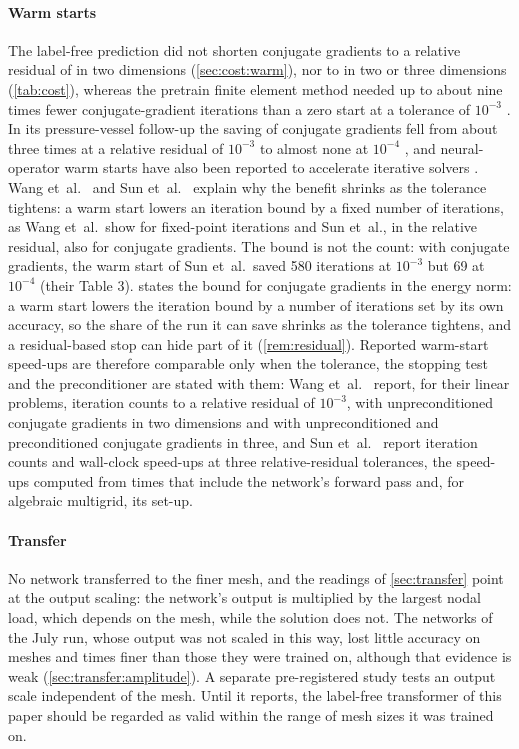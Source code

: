 \paragraph{Warm starts}
The label-free prediction did not shorten conjugate gradients to a relative residual of
\numKfiveTol{} in two dimensions (\cref{sec:cost:warm}), nor to \numCostCgTol{} in two or
three dimensions (\cref{tab:cost}), whereas the pretrain finite element
method needed up to about nine times fewer conjugate-gradient iterations than a zero start
at a tolerance of $10^{-3}$ \cite{Wang2026PretrainFEM}. In its pressure-vessel follow-up the
saving of conjugate gradients fell from about three times at a relative residual of
$10^{-3}$ to almost none at $10^{-4}$ \cite{Sun2026FEVessel}, and neural-operator warm
starts have also been reported to accelerate iterative solvers \cite{Eshaghi2026NOWS}.
Wang et~al.~\cite{Wang2026PretrainFEM} and Sun et~al.~\cite{Sun2026FEVessel} explain why
the benefit shrinks as the tolerance tightens: a warm start lowers an iteration bound by a
fixed number of iterations, as Wang et~al.\ show for fixed-point iterations and Sun et~al.,
in the relative residual, also for conjugate gradients. The bound is not the count: with
conjugate gradients, the warm start of Sun et~al.\ saved 580 iterations at $10^{-3}$ but 69
at $10^{-4}$ (their Table 3).  states the bound for conjugate gradients in the
energy norm: a warm start lowers the iteration bound by a number of iterations set by its
own accuracy, so the share of the run it can save shrinks as the tolerance tightens, and
a residual-based stop can hide part of it (\cref{rem:residual}). Reported warm-start
speed-ups are therefore comparable only when the tolerance, the stopping test and the
preconditioner are stated with them: Wang et~al.~\cite{Wang2026PretrainFEM} report, for
their linear problems, iteration counts to a relative residual of $10^{-3}$, with
unpreconditioned conjugate gradients in two dimensions and with unpreconditioned and
preconditioned conjugate gradients in three, and Sun et~al.~\cite{Sun2026FEVessel} report
iteration counts and wall-clock speed-ups at three relative-residual tolerances, the
speed-ups computed from times that include the network's forward pass and, for algebraic
multigrid, its set-up.

\paragraph{Transfer}
No network transferred to the finer mesh, and the readings of \cref{sec:transfer} point at
the output scaling: the network's output is multiplied by the largest nodal load, which
depends on the mesh, while the solution does not. The networks of the July run, whose output
was not scaled in this way, lost little accuracy on meshes \numCoarsenLow{} and
\numCoarsenHigh{} times finer than those they were trained on, although that evidence is
weak (\cref{sec:transfer:amplitude}). A separate pre-registered study tests an output scale
independent of the mesh. Until it reports, the label-free transformer of this paper should
be regarded as valid within the range of mesh sizes it was trained on.

